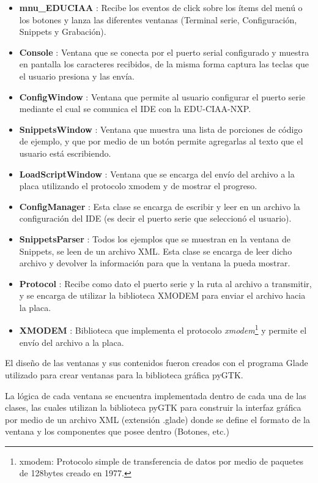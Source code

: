 \begin{itemize}
	\item \textbf{mnu\_EDUCIAA} : Recibe los eventos de click sobre los ítems del menú o los botones y lanza las diferentes ventanas (Terminal serie, Configuración, Snippets y Grabación).
	\item \textbf{Console} : Ventana que se conecta por el puerto serial configurado y muestra en pantalla los caracteres recibidos, de la misma forma captura las teclas que el usuario presiona y las envía.
	\item \textbf{ConfigWindow} : Ventana que permite al usuario configurar el puerto serie mediante el cual se comunica el IDE con la EDU-CIAA-NXP.
	\item \textbf{SnippetsWindow} : Ventana que muestra una lista de porciones de código de ejemplo, y que por medio de un botón permite agregarlas al texto que el usuario está escribiendo.
	\item \textbf{LoadScriptWindow} : Ventana que se encarga del envío del archivo a la placa utilizando el protocolo xmodem y de mostrar el progreso.
	\item \textbf{ConfigManager} : Esta clase se encarga de escribir y leer en un archivo la configuración del IDE (es decir el puerto serie que seleccionó el usuario).
	\item \textbf{SnippetsParser} : Todos los ejemplos que se muestran en la ventana de Snippets, se leen de un archivo XML. Esta clase se encarga de leer dicho archivo y devolver la información para que la ventana la pueda mostrar.	
	\item \textbf{Protocol} : Recibe como dato el puerto serie y la ruta al archivo a transmitir, y se encarga de utilizar la biblioteca XMODEM para enviar el archivo hacia la placa.
	\item \textbf{XMODEM} : Biblioteca que implementa el protocolo \textit{xmodem}\footnote{xmodem: Protocolo simple de transferencia de datos por medio de paquetes de 128bytes creado en 1977.} y permite el envío del archivo a la placa.	
\end{itemize}

El diseño de las ventanas y sus contenidos fueron creados con el programa Glade\cite{glade} utilizado para crear ventanas para la biblioteca gráfica pyGTK.

La lógica de cada ventana se encuentra implementada dentro de cada una de las clases, las cuales utilizan la biblioteca pyGTK para construir la interfaz gráfica por medio de un archivo XML (extensión .glade) donde se define el formato de la ventana y los componentes que posee dentro (Botones, etc.)

